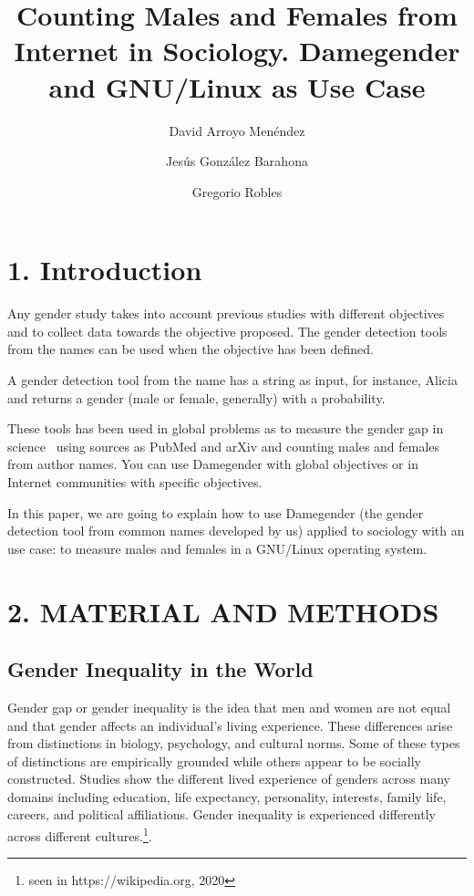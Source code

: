 \documentclass[fleqn,10pt,lineno]{wlpeerj} %
\title{Counting Males and Females from Internet in Sociology. Damegender and GNU/Linux as Use Case}
\author[1]{David Arroyo Menéndez}
\affil[1]{Universidad Rey Juan Carlos}
\author[2]{Jesús González Barahona}
\affil[2]{Universidad Rey Juan Carlos}
\author[3]{Gregorio Robles}
\affil[3]{Universidad Rey Juan Carlos}
\begin{document}
\flushbottom
\maketitle
\thispagestyle{empty}

\section*{1. Introduction}
Any gender study takes into account previous studies with different
objectives and to collect data towards the objective proposed. The
gender detection tools from the names can be used when the objective
has been defined.

A gender detection tool from the name has a string as input, for
instance, Alicia and returns a gender (male or female, generally) with
a probability.

These tools has been used in global problems as to measure the gender
gap in science~\cite{holman2018gender} using sources as PubMed and
arXiv and counting males and females from author names. You can use
Damegender with global objectives or in Internet communities with
specific objectives.

In this paper, we are going to explain how to use Damegender (the
gender detection tool from common names developed by us) applied to
sociology with an use case: to measure males and females in a
GNU/Linux operating system.

\section*{2. MATERIAL AND METHODS}

\subsection*{Gender Inequality in the World}

Gender gap or gender inequality is the idea that men and women are not
equal and that gender affects an individual's living experience. These
differences arise from distinctions in biology, psychology, and
cultural norms. Some of these types of distinctions are empirically
grounded while others appear to be socially constructed. Studies show
the different lived experience of genders across many domains
including education, life expectancy, personality, interests, family
life, careers, and political affiliations. Gender inequality is
experienced differently across different cultures.\footnote{seen in
  https://wikipedia.org, 2020}.
\end{document}
